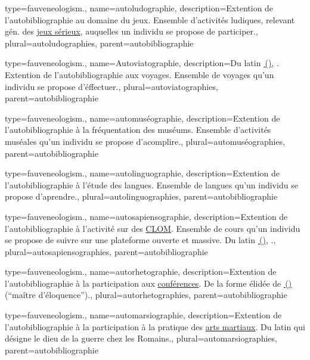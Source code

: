 {
{
  type=fauveneologism.,
    name={autoludographie},
    description={Extention de l’\gls{autobibliographie} au domaine du jeux. Ensemble d’activités ludiques, relevant gén. des \href{https://fr.wikipedia.org/wiki/Serious\_game}{jeux sérieux}, auquelles un individu se propose de participer.},
    plural={autoludographies},
    parent={autobibliographie}
}

{
  type=fauveneologism.,
    name={Autoviatographie},
    description={Du latin \href{https://fr.wiktionary.org/wiki/via\#Latin}{\,()}, . Extention de l’\gls{autobibliographie} aux voyages. Ensemble de voyages qu’un individu se propose d’éffectuer.},
    plural={autoviatographies},
    parent={autobibliographie}
}

{
  type=fauveneologism.,
    name={automuséographie},
    description={Extention de l’\gls{autobibliographie} à la fréquentation des muséums. Ensemble d’activités muséales qu’un individu se propose d’acomplire.},
    plural={automuséographies},
    parent={autobibliographie}
}

{
  type=fauveneologism.,
    name={autolinguographie},
    description={Extention de l’\gls{autobibliographie} à l’étude des langues. Ensemble de langues qu’un individu se propose d’aprendre.},
    plural={autolinguographies},
    parent={autobibliographie}
}

{
  type=fauveneologism.,
    name={autosapiensographie},
    description={Extention de l’\gls{autobibliographie} à l’activité sur des \href{https://fr.wikipedia.org/wiki/MOOC}{CLOM}. Ensemble de cours qu’un individu se propose de suivre sur une plateforme ouverte et massive. Du latin \href{https://fr.wiktionary.org/wiki/sapiens\#Nom\_commun}{\,()}, .},
    plural={autosapiensographies},
    parent={autobibliographie}
}

{
  type=fauveneologism.,
    name={autorhetographie},
    description={Extention de l’\gls{autobibliographie} à la participation aux \href{https://fr.wikipedia.org/wiki/Conférence}{conférences}. De la forme élidée de \href{https://fr.wiktionary.org/wiki/rhetor\#la}{\,()} (\enquote{maître d’éloquence}).},
    plural={autorhetographies},
    parent={autobibliographie}
}

{
  type=fauveneologism.,
    name={automarsiographie},
    description={Extention de l’\gls{autobibliographie} à la participation à la pratique des \href{https://fr.wikipedia.org/wiki/Arts\_martiaux}{arts martiaux}. Du latin \href{https://fr.wiktionary.org/wiki/rhetor\#la}{} qui désigne le dieu de la guerre chez les Romains.},
    plural={automarsiographies},
    parent={autobibliographie}
}

}
